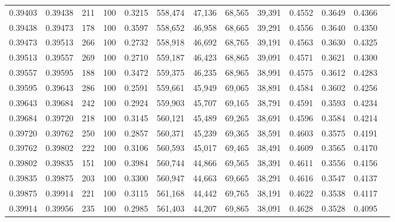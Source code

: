 \begin{tabular}{rrrrrrrrrrrrr}
0.39403 & 0.39438 &   211 & 100 &                                     0.3215 & 558,474 &  47,136 &  68,565 &  39,391 & 0.4552 & 0.3649 & 0.4366 \\
0.39438 & 0.39473 &   178 & 100 &                                     0.3597 & 558,652 &  46,958 &  68,665 &  39,291 & 0.4556 & 0.3640 & 0.4350 \\
0.39473 & 0.39513 &   266 & 100 &                                     0.2732 & 558,918 &  46,692 &  68,765 &  39,191 & 0.4563 & 0.3630 & 0.4325 \\
0.39513 & 0.39557 &   269 & 100 &                                     0.2710 & 559,187 &  46,423 &  68,865 &  39,091 & 0.4571 & 0.3621 & 0.4300 \\
0.39557 & 0.39595 &   188 & 100 &                                     0.3472 & 559,375 &  46,235 &  68,965 &  38,991 & 0.4575 & 0.3612 & 0.4283 \\
0.39595 & 0.39643 &   286 & 100 &                                     0.2591 & 559,661 &  45,949 &  69,065 &  38,891 & 0.4584 & 0.3602 & 0.4256 \\
0.39643 & 0.39684 &   242 & 100 &                                     0.2924 & 559,903 &  45,707 &  69,165 &  38,791 & 0.4591 & 0.3593 & 0.4234 \\
0.39684 & 0.39720 &   218 & 100 &                                     0.3145 & 560,121 &  45,489 &  69,265 &  38,691 & 0.4596 & 0.3584 & 0.4214 \\
0.39720 & 0.39762 &   250 & 100 &                                     0.2857 & 560,371 &  45,239 &  69,365 &  38,591 & 0.4603 & 0.3575 & 0.4191 \\
0.39762 & 0.39802 &   222 & 100 &                                     0.3106 & 560,593 &  45,017 &  69,465 &  38,491 & 0.4609 & 0.3565 & 0.4170 \\
0.39802 & 0.39835 &   151 & 100 &                                     0.3984 & 560,744 &  44,866 &  69,565 &  38,391 & 0.4611 & 0.3556 & 0.4156 \\
0.39835 & 0.39875 &   203 & 100 &                                     0.3300 & 560,947 &  44,663 &  69,665 &  38,291 & 0.4616 & 0.3547 & 0.4137 \\
0.39875 & 0.39914 &   221 & 100 &                                     0.3115 & 561,168 &  44,442 &  69,765 &  38,191 & 0.4622 & 0.3538 & 0.4117 \\
0.39914 & 0.39956 &   235 & 100 &                                     0.2985 & 561,403 &  44,207 &  69,865 &  38,091 & 0.4628 & 0.3528 & 0.4095 \\

\end{tabular}
